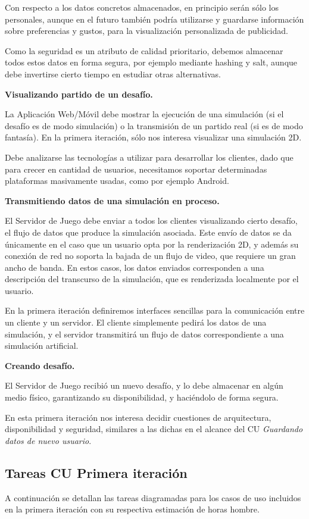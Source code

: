 \documentclass[a4paper, 10pt, twoside]{article}
\begin{document}
Con respecto a los datos concretos almacenados, en principio serán sólo los personales, aunque en el futuro también podría utilizarse y guardarse información sobre preferencias y gustos, para la visualización personalizada de publicidad.

Como la seguridad es un atributo de calidad prioritario, debemos almacenar todos estos datos en forma segura, por ejemplo mediante hashing y salt, aunque debe invertirse cierto tiempo en estudiar otras alternativas.

\textbf{Visualizando partido de un desafío.}

La Aplicación Web/Móvil debe mostrar la ejecución de una simulación (si el desafío es de modo simulación) o la transmisión de un partido real (si es de modo fantasía). En la primera iteración, sólo nos interesa visualizar una simulación 2D.

Debe analizarse las tecnologías a utilizar para desarrollar los clientes, dado que para crecer en cantidad de usuarios, necesitamos soportar determinadas plataformas masivamente usadas, como por ejemplo Android.

\textbf{Transmitiendo datos de una simulación en proceso.}

El Servidor de Juego debe enviar a todos los clientes visualizando cierto desafío, el flujo de datos que produce la simulación asociada. Este envío de datos se da únicamente en el caso que un usuario opta por la renderización 2D, y además su conexión de red no soporta la bajada de un flujo de video, que requiere un gran ancho de banda. En estos casos, los datos enviados corresponden a una descripción del transcurso de la simulación, que es renderizada localmente por el usuario.

En la primera iteración definiremos interfaces sencillas para la comunicación entre un cliente y un servidor. El cliente simplemente pedirá los datos de una simulación, y el servidor transmitirá un flujo de datos correspondiente a una simulación artificial.

\textbf{Creando desafío.}

El Servidor de Juego recibió un nuevo desafío, y lo debe almacenar en algún medio físico, garantizando su disponibilidad, y haciéndolo de forma segura.

En esta primera iteración nos interesa decidir cuestiones de arquitectura, disponibilidad y seguridad, similares a las dichas en el alcance del CU \textit{Guardando datos de nuevo usuario}.

\subsection{Tareas CU Primera iteración}
A continuación se detallan las tareas diagramadas para los casos de uso incluidos en la primera iteración con su respectiva estimación de horas hombre.
\\
\end{document}
